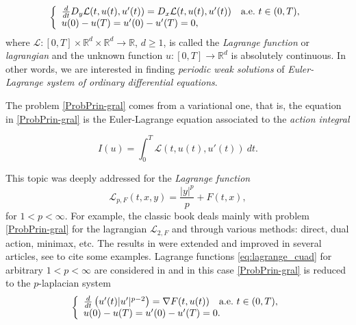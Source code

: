 \documentclass[twoside]{elsarticle}
\theoremstyle{remark}
\newcommand{\rr}{\mathbb{R}}
\renewcommand{\geq}{\geqslant}
\newcounter{example}
\begin{document}
\begin{equation}\label{ProbPrin-gral}
    \left\{%
\begin{array}{ll}
  \frac{d}{dt} D_{y}\mathcal{L}(t,u(t),u'(t))= D_{x}\mathcal{L}(t,u(t),u'(t)) \quad \hbox{a.e.}\ t \in (0,T),\\
    u(0)-u(T)=u'(0)-u'(T)=0,
\end{array}%
\right.
\end{equation}
where $\mathcal{L}:[0,T]\times\rr^d\times\rr^d\to\rr$, $d\geq 1$, is called the \emph{Lagrange function} or \emph{lagrangian} and the unknown function  $u:[0,T]\to\rr^d$ is absolutely continuous. In other words, we are interested in  finding \emph{periodic weak solutions} of \emph{Euler-Lagrange system of ordinary differential equations}. 

The problem \eqref{ProbPrin-gral} comes from a variational one, that is,  the equation in  \eqref{ProbPrin-gral} is the Euler-Lagrange equation associated to the \emph{action integral}

\begin{equation}\label{integral_accion}
I(u)=\int_{0}^T \mathcal{L}(t,u(t),u'(t))\ dt.
\end{equation}




This topic was deeply addressed for the \emph{Lagrange function}
\begin{equation}\label{eq:lagrange_cuad}
\mathcal{L}_{p,F}(t,x,y)=\frac{|y|^p}{p}+F(t,x),
\end{equation}
for $1<p<\infty$. For example, the classic book  \cite{mawhin2010critical} deals mainly with problem \eqref{ProbPrin-gral} for the lagrangian $\mathcal{L}_{2,F}$ and through various methods: direct, dual action, minimax, etc. The results in \cite{mawhin2010critical} were extended and improved in several articles, see  \cite{tang1995periodic,tang1998periodic,wu1999periodic,tang2001periodic,zhao2004periodic}  to cite some examples. Lagrange functions \eqref{eq:lagrange_cuad} for arbitrary $1<p<\infty$ are considered in  \cite{Tian2007192,tang2010periodic} and in this case \eqref{ProbPrin-gral}  is reduced to the $p$-laplacian system
\begin{equation*}\label{ProbP-lapla}
    \left\{%
\begin{array}{ll}
   \frac{d}{dt}\left(u'(t)|u'|^{p-2}\right) = \nabla F(t,u(t)) \quad \hbox{a.e.}\ t \in (0,T),\\
    u(0)-u(T)=u'(0)-u'(T)=0.
\end{array}%
\right.
\end{equation*}
\end{document}
